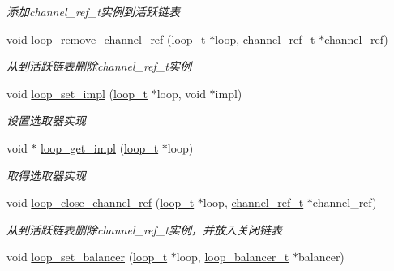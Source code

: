 \begin{DoxyCompactItemize}
\begin{DoxyCompactList}\small\item\em 添加channel\+\_\+ref\+\_\+t实例到活跃链表 \end{DoxyCompactList}\item 
void \hyperlink{a00069_a074c9c3a80a8a5c57b831e41395d4ef5_a074c9c3a80a8a5c57b831e41395d4ef5}{loop\+\_\+remove\+\_\+channel\+\_\+ref} (\hyperlink{a00051_a9c3ad1cd2de83e09f3a7b59fa82c94ee_a9c3ad1cd2de83e09f3a7b59fa82c94ee}{loop\+\_\+t} $\ast$loop, \hyperlink{a00051_a151271c9d188ef28d4d24bb81dcc1263_a151271c9d188ef28d4d24bb81dcc1263}{channel\+\_\+ref\+\_\+t} $\ast$channel\+\_\+ref)
\begin{DoxyCompactList}\small\item\em 从到活跃链表删除channel\+\_\+ref\+\_\+t实例 \end{DoxyCompactList}\item 
void \hyperlink{a00069_aa9654f1b872059f74665506fd67c9bc5_aa9654f1b872059f74665506fd67c9bc5}{loop\+\_\+set\+\_\+impl} (\hyperlink{a00051_a9c3ad1cd2de83e09f3a7b59fa82c94ee_a9c3ad1cd2de83e09f3a7b59fa82c94ee}{loop\+\_\+t} $\ast$loop, void $\ast$impl)
\begin{DoxyCompactList}\small\item\em 设置选取器实现 \end{DoxyCompactList}\item 
void $\ast$ \hyperlink{a00069_a0f78295541723911955dd41b71ceece1_a0f78295541723911955dd41b71ceece1}{loop\+\_\+get\+\_\+impl} (\hyperlink{a00051_a9c3ad1cd2de83e09f3a7b59fa82c94ee_a9c3ad1cd2de83e09f3a7b59fa82c94ee}{loop\+\_\+t} $\ast$loop)
\begin{DoxyCompactList}\small\item\em 取得选取器实现 \end{DoxyCompactList}\item 
void \hyperlink{a00069_a9328cf8ba2faccbf363b41e524631b75_a9328cf8ba2faccbf363b41e524631b75}{loop\+\_\+close\+\_\+channel\+\_\+ref} (\hyperlink{a00051_a9c3ad1cd2de83e09f3a7b59fa82c94ee_a9c3ad1cd2de83e09f3a7b59fa82c94ee}{loop\+\_\+t} $\ast$loop, \hyperlink{a00051_a151271c9d188ef28d4d24bb81dcc1263_a151271c9d188ef28d4d24bb81dcc1263}{channel\+\_\+ref\+\_\+t} $\ast$channel\+\_\+ref)
\begin{DoxyCompactList}\small\item\em 从到活跃链表删除channel\+\_\+ref\+\_\+t实例，并放入关闭链表 \end{DoxyCompactList}\item 
void \hyperlink{a00069_abedbb538c1cc8ef805dbfc0f58d80f9e_abedbb538c1cc8ef805dbfc0f58d80f9e}{loop\+\_\+set\+\_\+balancer} (\hyperlink{a00051_a9c3ad1cd2de83e09f3a7b59fa82c94ee_a9c3ad1cd2de83e09f3a7b59fa82c94ee}{loop\+\_\+t} $\ast$loop, \hyperlink{a00051_a649c7e850ab247b5f70ad27e335a129d_a649c7e850ab247b5f70ad27e335a129d}{loop\+\_\+balancer\+\_\+t} $\ast$balancer)

\end{DoxyCompactItemize}
